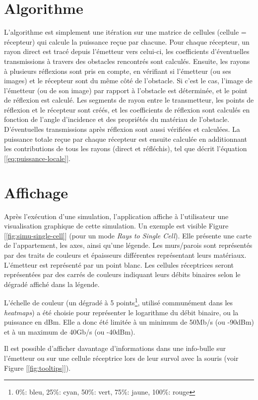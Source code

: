 \section{Algorithme}
L'algorithme est simplement une itération sur une matrice de cellules (cellule = récepteur) qui calcule la puissance reçue par chacune. Pour chaque récepteur, un rayon direct est tracé depuis l'émetteur vers celui-ci, les coefficients d'éventuelles transmissions à travers des obstacles rencontrés sont calculés. Ensuite, les rayons à plusieurs réflexions sont pris en compte, en vérifiant si l'émetteur (ou ses images) et le récepteur sont du même côté de l'obstacle. Si c'est le cas, l'image de l'émetteur (ou de son image) par rapport à l'obstacle est déterminée, et le point de réflexion est calculé. Les segments de rayon entre le transmetteur, les points de réflexion et le récepteur sont créés, et les coefficients de réflexion sont calculés en fonction de l'angle d'incidence et des propriétés du matériau de l'obstacle. D'éventuelles transmissions après réflexion sont aussi vérifiées et calculées. La puissance totale reçue par chaque récepteur est ensuite calculée en additionnant les contributions de tous les rayons (direct et réfléchis), tel que décrit l'équation [\ref{eq:puissance-locale}].

\section{Affichage}
Après l'exécution d'une simulation, l'application affiche à l'utilisateur une visualisation graphique de cette simulation. Un exemple est visible Figure [\ref{fig:simu-single-cell}] (pour un mode \textit{Rays to Single Cell}). Elle présente une carte de l'appartement, les axes, ainsi qu'une légende. Les murs/parois sont représentés par des traits de couleurs et épaisseurs différentes représentant leurs matériaux. L'émetteur est représenté par un point blanc. Les cellules réceptrices seront représentées par des carrés de couleurs indiquant leurs débits binaires selon le dégradé affiché dans la légende.

L'échelle de couleur (un dégradé à 5 points\footnote{0\%: bleu, 25\%: cyan, 50\%: vert, 75\%: jaune, 100\%: rouge}, utilisé communément dans les \textit{heatmaps}) a été choisie pour représenter le logarithme du débit binaire, ou la puissance en dBm. Elle a donc été limitée à un minimum de 50Mb/s (ou -90dBm) et à un maximum de 40Gb/s (ou -40dBm).

Il est possible d'afficher davantage d'informations dans une info-bulle sur l'émetteur ou sur une cellule réceptrice lors de leur survol avec la souris (voir Figure [\ref{fig:tooltips}]).

